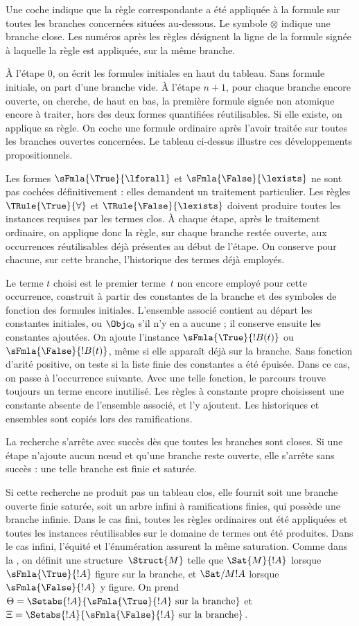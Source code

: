 \documentclass[../../../include/open-logic-section]{subfiles}
\begin{document}
Une coche indique que la règle correspondante
a été appliquée à la formule sur toutes les
branches concernées situées au-dessous.
Le symbole $\otimes$ indique une branche close.
Les numéros après les règles désignent la ligne
de la formule signée à laquelle la règle
est appliquée, sur la même branche.

À l'étape $0$, on écrit les formules initiales en haut
du tableau. Sans formule initiale, on part d'une branche
vide. À l'étape $n+1$, pour chaque branche encore
ouverte, on cherche, de haut en bas, la première
formule signée non atomique encore à traiter,
hors des deux formes quantifiées réutilisables.
Si elle existe, on applique sa règle. On coche
une formule ordinaire après l'avoir traitée
sur toutes les branches ouvertes concernées.
Le tableau ci-dessus illustre ces développements
propositionnels.

Les formes $\sFmla{\True}{\lforall}$ et
$\sFmla{\False}{\lexists}$ ne sont pas cochées
définitivement : elles demandent un traitement
particulier. Les règles $\TRule{\True}{\forall}$
et $\TRule{\False}{\lexists}$ doivent produire
toutes les instances requises par les termes
clos. À chaque étape, après le traitement
ordinaire, on applique donc la règle, sur chaque
branche restée ouverte, aux occurrences réutilisables
déjà présentes au début de l'étape. On conserve pour
chacune, sur cette branche, l'historique des termes
déjà employés.

Le terme $t$ choisi est le premier terme~$t$
non encore employé pour cette occurrence,
construit à partir des constantes de la branche
et des symboles de fonction des formules
initiales. L'ensemble associé contient au
départ les constantes initiales, ou $\Obj c_0$
s'il n'y en a aucune ; il conserve ensuite
les constantes ajoutées. On ajoute l'instance
$\sFmla{\True}{!B(t)}$ ou~$\sFmla{\False}{!B(t)}$,
même si elle apparaît déjà sur la branche.
Sans fonction d'arité positive, on teste si la liste
finie des constantes a été épuisée. Dans ce cas, on
passe à l'occurrence suivante. Avec une telle fonction,
le parcours trouve toujours un terme encore inutilisé.
Les règles à constante propre choisissent
une constante absente de l'ensemble associé,
et l'y ajoutent. Les historiques et ensembles
sont copiés lors des ramifications.

La recherche s'arrête avec succès dès que toutes
les branches sont closes. Si une étape n'ajoute
aucun nœud et qu'une branche reste ouverte,
elle s'arrête sans succès : une telle branche
est finie et saturée.

Si cette recherche ne produit pas un tableau
clos, elle fournit soit une branche ouverte
finie saturée, soit un arbre infini à
ramifications finies, qui possède une branche
infinie. Dans le cas fini, toutes les règles
ordinaires ont été appliquées et toutes les
instances réutilisables sur le domaine de
termes ont été produites. Dans le cas infini,
l'équité et l'énumération assurent la même
saturation. Comme dans la ,
on définit une structure~$\Struct{M}$ telle que
$\Sat{M}{!A}$ lorsque $\sFmla{\True}{!A}$
figure sur la branche, et $\Sat/{M}{!A}$
lorsque $\sFmla{\False}{!A}$ y figure.
On prend
$\Theta = \Setabs{!A}{\sFmla{\True}{!A} \text{ sur la branche}}$
et
$\Xi = \Setabs{!A}{\sFmla{\False}{!A} \text{ sur la branche}}$.
\end{document}
